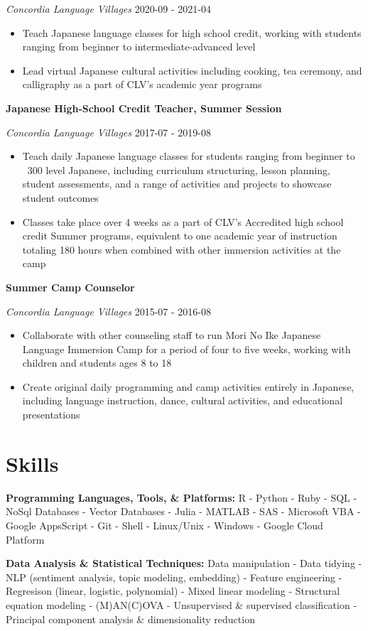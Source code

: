 \documentclass[a4paper,9pt]{extarticle}
\begin{document}
\noindent\textit{Concordia Language Villages} \hfill 2020-09 - 2021-04
\begin{itemize}\item Teach Japanese language classes for high school credit, working with students ranging from beginner to intermediate-advanced level
\item Lead virtual Japanese cultural activities including cooking, tea ceremony, and calligraphy as a part of CLV's academic year programs
\end{itemize}
\noindent\textbf{Japanese High-School Credit Teacher, Summer Session} 

\noindent\textit{Concordia Language Villages} \hfill 2017-07 - 2019-08
\begin{itemize}\item Teach daily Japanese language classes for students ranging from beginner to ~300 level Japanese, including curriculum structuring, lesson planning, student assessments, and a range of activities and projects to showcase student outcomes
\item Classes take place over 4 weeks as a part of CLV's Accredited high school credit Summer programs, equivalent to one academic year of instruction totaling 180 hours when combined with other immersion activities at the camp
\end{itemize}
\noindent\textbf{Summer Camp Counselor} 

\noindent\textit{Concordia Language Villages} \hfill 2015-07 - 2016-08
\begin{itemize}\item Collaborate with other counseling staff to run Mori No Ike Japanese Language Immersion Camp for a period of four to five weeks, working with children and students ages 8 to 18
\item Create original daily programming and camp activities entirely in Japanese, including language instruction, dance, cultural activities, and educational presentations
\end{itemize}

\section*{Skills}
\noindent\textbf{Programming Languages, Tools, \& Platforms:} R - Python - Ruby - SQL - NoSql Databases - Vector Databases - Julia - MATLAB - SAS - Microsoft VBA - Google AppsScript - Git - Shell - Linux/Unix - Windows - Google Cloud Platform

\noindent\textbf{Data Analysis \& Statistical Techniques:} Data manipulation - Data tidying - NLP (sentiment analysis, topic modeling, embedding) - Feature engineering - Regresison (linear, logistic, polynomial) - Mixed linear modeling - Structural equation modeling - (M)AN(C)OVA - Unsupervised \& supervised classification - Principal component analysis \& dimensionality reduction
\end{document}
